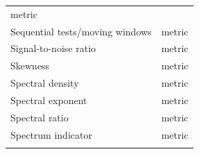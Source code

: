 \documentclass[12pt,twoside,openany]{reedthesis}
\begin{document}
\begin{longtable}[]{@{}lc@{}}
\begin{minipage}[t]{0.34\columnwidth}
metric\strut
\end{minipage}\tabularnewline
\begin{minipage}[t]{0.31\columnwidth}\raggedright\strut
Sequential tests/moving windows\strut
\end{minipage} & \begin{minipage}[t]{0.34\columnwidth}\centering\strut
metric\strut
\end{minipage}\tabularnewline
\begin{minipage}[t]{0.31\columnwidth}\raggedright\strut
Signal-to-noise ratio\strut
\end{minipage} & \begin{minipage}[t]{0.34\columnwidth}\centering\strut
metric\strut
\end{minipage}\tabularnewline
\begin{minipage}[t]{0.31\columnwidth}\raggedright\strut
Skewness\strut
\end{minipage} & \begin{minipage}[t]{0.34\columnwidth}\centering\strut
metric\strut
\end{minipage}\tabularnewline
\begin{minipage}[t]{0.31\columnwidth}\raggedright\strut
Spectral density\strut
\end{minipage} & \begin{minipage}[t]{0.34\columnwidth}\centering\strut
metric\strut
\end{minipage}\tabularnewline
\begin{minipage}[t]{0.31\columnwidth}\raggedright\strut
Spectral exponent\strut
\end{minipage} & \begin{minipage}[t]{0.34\columnwidth}\centering\strut
metric\strut
\end{minipage}\tabularnewline
\begin{minipage}[t]{0.31\columnwidth}\raggedright\strut
Spectral ratio\strut
\end{minipage} & \begin{minipage}[t]{0.34\columnwidth}\centering\strut
metric\strut
\end{minipage}\tabularnewline
\begin{minipage}[t]{0.31\columnwidth}\raggedright\strut
Spectrum indicator\strut
\end{minipage} & \begin{minipage}[t]{0.34\columnwidth}\centering\strut
metric\strut
\end{minipage}\tabularnewline
\begin{minipage}[t]{0.31\columnwidth}\raggedright\strut

\end{minipage}
\end{longtable}
\end{document}
